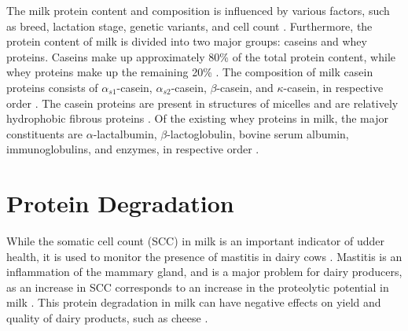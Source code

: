 \vspace{0.5em}
The milk protein content and composition is influenced by various factors, such as breed, lactation stage, genetic variants, and cell count \cite*{s04_protein_fraction_in_milk}. Furthermore, the protein content of milk is divided into two major groups: caseins and whey proteins. Caseins make up approximately 80\% of the total protein content, while whey proteins make up the remaining 20\% \cite*{s04_protein_fraction_in_milk}. The composition of milk casein proteins consists of $\alpha_{s1}$-casein, $\alpha_{s2}$-casein, $\beta$-casein, and $\kappa$-casein, in respective order \cite*{s04_protein_fraction_in_milk}. The casein proteins are present in structures of micelles and are relatively hydrophobic fibrous proteins \cite*{b01_milk_biochemistry}. Of the existing whey proteins in milk, the major constituents are $\alpha$-lactalbumin, $\beta$-lactoglobulin, bovine serum albumin, immunoglobulins, and enzymes, in respective order \cite*{s04_protein_fraction_in_milk}.




%


\section{Protein Degradation}
While the somatic cell count (SCC) in milk is an important indicator of udder health, it is used to monitor the presence of mastitis in dairy cows \cite*{s05_mastitis_complex}. Mastitis is an inflammation of the mammary gland, and is a major problem for dairy producers, as an increase in SCC corresponds to an increase in the proteolytic potential in milk \cite*{a02_proteases_and_protein_degradation}. This protein degradation in milk can have negative effects on yield and quality of dairy products, such as cheese \cite*{a02_proteases_and_protein_degradation}.


